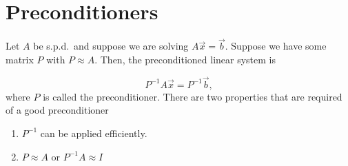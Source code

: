 \section{Preconditioners}

Let $A$ be s.p.d.\ and suppose we are solving $A\vec{x}=\vec{b}$. Suppose we have some matrix $P$ with $P\approx A$. Then, the preconditioned linear system is

\begin{equation*}
    P^{-1}A\vec{x} = P^{-1}\vec{b},
\end{equation*}
where $P$ is called the preconditioner. There are two properties that are required of a good preconditioner

\begin{enumerate}[1)]
    \item $P^{-1}$ can be applied efficiently.
    \item $P\approx A$ or $P^{-1}A\approx I$
\end{enumerate}

